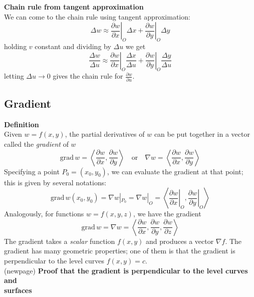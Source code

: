 \documentclass{report}
\begin{document}
\textbf{Chain rule from tangent approximation}\\
We can come to the chain rule using tangent approximation:
\begin{equation*}
\Delta w\approx\left.\frac{\partial w}{\partial x}\right|_O\Delta x
+\left.\frac{\partial w}{\partial y}\right|_O\Delta y
\end{equation*}
holding $v$ constant and dividing by $\Delta u$ we get
\begin{equation*}
\frac{\Delta w}{\Delta u}\approx\left.\frac{\partial w}{\partial x}\right|_O\frac{\Delta x}{\Delta u}
+\left.\frac{\partial w}{\partial y}\right|_O\frac{\Delta y}{\Delta u}
\end{equation*}
letting $\Delta u\to0$ gives the chain rule for $\frac{\partial w}{\partial u}$.
\newpage

\subsection{Gradient}%
\textbf{Definition}\\
Given $w=f(x,y)$, the partial derivatives of $w$ can be put together in a vector called the \textit{gradient} of $w$
\begin{equation*}
\text{grad}\,w=\left\langle\frac{\partial w}{\partial x},
\frac{\partial w}{\partial y}\right\rangle\quad\text{or}
\quad\nabla w=\left\langle\frac{\partial w}{\partial x},
\frac{\partial w}{\partial y}\right\rangle
\end{equation*}
Specifying a point $P_0=(x_0,y_0)$, we can evaluate the gradient at that point; this is given by several notations:
\begin{equation*}
\text{grad}\,w(x_0,y_0)=\nabla w|_{P_0}
=\nabla w|_O=\left\langle\left.\frac{\partial w}{\partial x}\right|_O,
\left.\frac{\partial w}{\partial y}\right|_O\right\rangle
\end{equation*}
Analogously, for functions $w=f(x,y,z)$, we have the gradient
\begin{equation*}
\text{grad}\,w=\nabla w=\left\langle\frac{\partial w}{\partial x},
\frac{\partial w}{\partial y},\frac{\partial w}{\partial z}\right\rangle
\end{equation*}
The gradient takes a \textit{scalar} function $f(x,y)$ and produces a vector $\nabla f$. The gradient has many 
geometric properties; one of them is that the gradient is perpendicular to the level curves $f(x,y)=c$.\\
(newpage)
\newpage
\noindent\textbf{Proof that the gradient is perpendicular to the level curves and\\surfaces}\\
\end{document}
